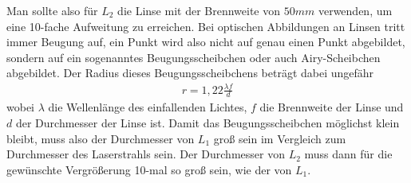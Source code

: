 \documentclass[a4paper,10pt]{scrartcl}
\begin{document}
			Man sollte also für \(L_{2}\) die Linse mit der Brennweite von \(50mm\) verwenden, um eine 10-fache Aufweitung zu erreichen. Bei optischen Abbildungen an Linsen tritt immer Beugung auf, ein Punkt wird also nicht auf genau einen Punkt abgebildet, sondern auf ein sogenanntes Beugungsscheibchen oder auch Airy-Scheibchen abgebildet. Der Radius dieses Beugungsscheibchens beträgt dabei ungefähr
			\begin{align*}
			r=1,22\frac{\lambda f}{d}
			\end{align*}
			wobei \(\lambda\) die Wellenlänge des einfallenden Lichtes, \(f\) die Brennweite der Linse und \(d\) der Durchmesser der Linse ist. Damit das Beugungsscheibchen möglichst klein bleibt, muss also der Durchmesser von \(L_{1}\) groß sein im Vergleich zum Durchmesser des Laserstrahls sein. Der Durchmesser von \(L_{2}\) muss dann für die gewünschte Vergrößerung 10-mal so groß sein, wie der von \(L_{1}\).
			
\end{document}
